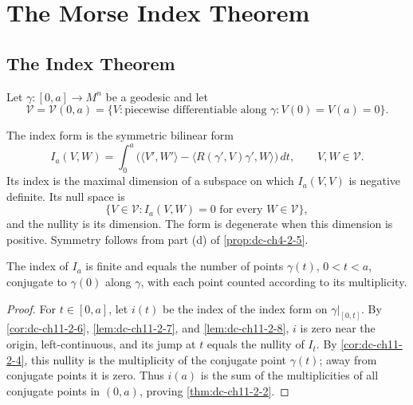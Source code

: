 \chapter{The Morse Index Theorem}
\label{chap:dc-morse-index-theorem}

\section{The Index Theorem}

Let $\gamma:[0,a]\to M^n$ be a geodesic and let
\[
  \mathcal V=\mathcal V(0,a)=\{V:\text{piecewise differentiable along }\gamma:
  V(0)=V(a)=0\}.
\]

\begin{definition}
  \label{def:dc-ch11-2-1}
  The index form is the symmetric bilinear form
  \[
  I_a(V,W)=\int_0^a\bigl(\langle V',W'\rangle-
  \langle R(\gamma',V)\gamma',W\rangle\bigr)\,dt,
  \qquad V,W\in\mathcal V.
  \]
  Its index is the maximal dimension of a subspace on which $I_a(V,V)$ is
  negative definite. Its null space is
  \[
  \{V\in\mathcal V:I_a(V,W)=0\text{ for every }W\in\mathcal V\},
  \]
  and the nullity is its dimension. The form is degenerate when this dimension
  is positive. Symmetry follows from part (d) of \cref{prop:dc-ch4-2-5}.
\end{definition}

\begin{theorem}
  \label{thm:dc-ch11-2-2}
  The index of $I_a$ is finite and equals the number of points $\gamma(t)$,
  $0<t<a$, conjugate to $\gamma(0)$ along $\gamma$, with each point counted
  according to its multiplicity.
\end{theorem}
\begin{proof}
  \sketch
  For $t\in[0,a]$, let $i(t)$ be the index of the index form on
  $\gamma|_{[0,t]}$. By \cref{cor:dc-ch11-2-6}, \cref{lem:dc-ch11-2-7}, and
  \cref{lem:dc-ch11-2-8}, $i$ is zero near the origin, left-continuous, and its
  jump at $t$ equals the nullity of $I_t$. By \cref{cor:dc-ch11-2-4}, this nullity
  is the multiplicity of the conjugate point $\gamma(t)$; away from conjugate
  points it is zero. Thus $i(a)$ is the sum of the multiplicities of all conjugate
  points in $(0,a)$, proving \cref{thm:dc-ch11-2-2}.
\end{proof}

